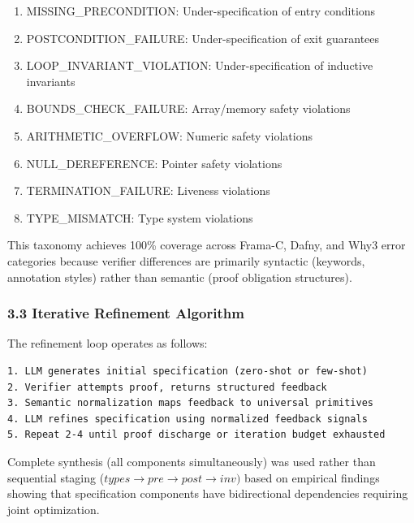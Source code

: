 \begin{enumerate}
\item MISSING\_PRECONDITION: Under-specification of entry conditions
\item POSTCONDITION\_FAILURE: Under-specification of exit guarantees
\item LOOP\_INVARIANT\_VIOLATION: Under-specification of inductive invariants
\item BOUNDS\_CHECK\_FAILURE: Array/memory safety violations
\item ARITHMETIC\_OVERFLOW: Numeric safety violations
\item NULL\_DEREFERENCE: Pointer safety violations
\item TERMINATION\_FAILURE: Liveness violations
\item TYPE\_MISMATCH: Type system violations
\end{enumerate}

This taxonomy achieves 100\% coverage across Frama-C, Dafny, and Why3 error categories because verifier differences are primarily syntactic (keywords, annotation styles) rather than semantic (proof obligation structures).

\subsubsection{3.3 Iterative Refinement Algorithm}

The refinement loop operates as follows:

\begin{verbatim}
1. LLM generates initial specification (zero-shot or few-shot)
2. Verifier attempts proof, returns structured feedback
3. Semantic normalization maps feedback to universal primitives
4. LLM refines specification using normalized feedback signals
5. Repeat 2-4 until proof discharge or iteration budget exhausted
\end{verbatim}

Complete synthesis (all components simultaneously) was used rather than sequential staging ($types\rightarrow pre\rightarrow post\rightarrow inv)$ based on empirical findings showing that specification components have bidirectional dependencies requiring joint optimization.
